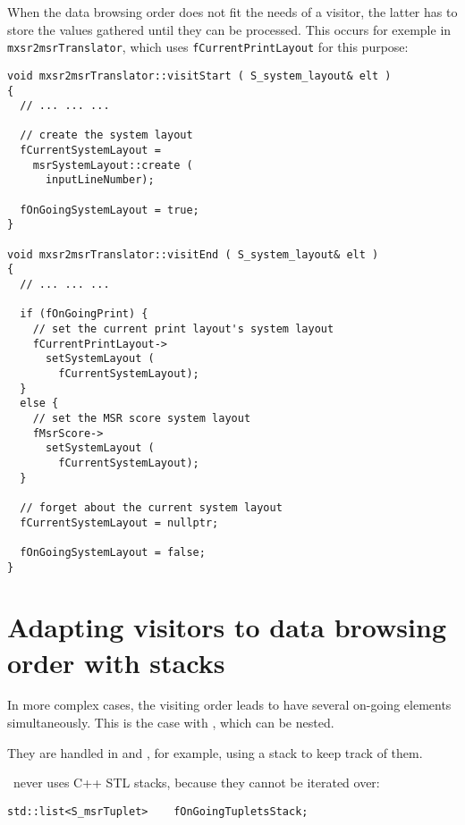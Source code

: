 When the data browsing order does not fit the needs of a visitor, the latter has to store the values gathered until they can be processed. This occurs for exemple in {\tt mxsr2msrTranslator}, which uses {\tt fCurrentPrintLayout} for this purpose:
\begin{lstlisting}[language=CPlusPlus]
void mxsr2msrTranslator::visitStart ( S_system_layout& elt )
{
  // ... ... ...

  // create the system layout
  fCurrentSystemLayout =
    msrSystemLayout::create (
      inputLineNumber);

  fOnGoingSystemLayout = true;
}

void mxsr2msrTranslator::visitEnd ( S_system_layout& elt )
{
  // ... ... ...

  if (fOnGoingPrint) {
    // set the current print layout's system layout
    fCurrentPrintLayout->
      setSystemLayout (
        fCurrentSystemLayout);
  }
  else {
    // set the MSR score system layout
    fMsrScore->
      setSystemLayout (
        fCurrentSystemLayout);
  }

  // forget about the current system layout
  fCurrentSystemLayout = nullptr;

  fOnGoingSystemLayout = false;
}
\end{lstlisting}


\section{Adapting visitors to data browsing order with stacks}

In more complex cases, the visiting order leads to have several on-going elements simultaneously. This is the case with , which can be nested.

They are handled in  and , for example, using a stack to keep track of them.

\mf\ never uses C++ STL stacks, because they cannot be iterated over:
\begin{lstlisting}[language=CPlusPlus]
    std::list<S_msrTuplet>    fOnGoingTupletsStack;
\end{lstlisting}

